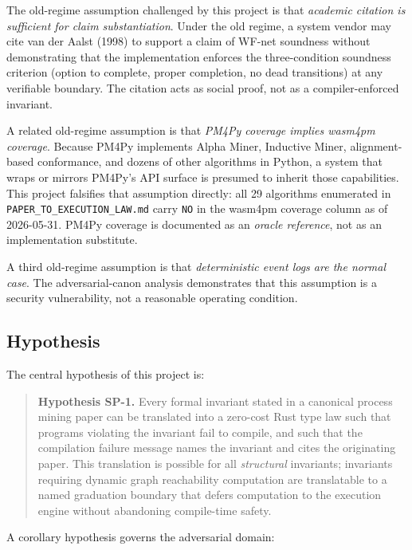 The old-regime assumption challenged by this project is that \emph{academic
citation is sufficient for claim substantiation}. Under the old regime, a
system vendor may cite van der Aalst (1998) to support a claim of WF-net
soundness without demonstrating that the implementation enforces the
three-condition soundness criterion (option to complete, proper completion,
no dead transitions) at any verifiable boundary. The citation acts as social
proof, not as a compiler-enforced invariant.

A related old-regime assumption is that \emph{PM4Py coverage implies wasm4pm
coverage}. Because PM4Py implements Alpha Miner, Inductive Miner,
alignment-based conformance, and dozens of other algorithms in Python, a
system that wraps or mirrors PM4Py's API surface is presumed to inherit those
capabilities. This project falsifies that assumption directly: all 29
algorithms enumerated in \texttt{PAPER\_TO\_EXECUTION\_LAW.md} carry
\texttt{NO} in the wasm4pm coverage column as of 2026-05-31. PM4Py coverage
is documented as an \emph{oracle reference}, not as an implementation
substitute.

A third old-regime assumption is that \emph{deterministic event logs are the
normal case}. The adversarial-canon analysis demonstrates that this assumption
is a security vulnerability, not a reasonable operating condition.

\subsection{Hypothesis}
\label{sec:sources-papers-rq-hypothesis}

The central hypothesis of this project is:

\begin{quotation}
\noindent\textbf{Hypothesis SP-1.} Every formal invariant stated in a canonical
process mining paper can be translated into a zero-cost Rust type law such that
programs violating the invariant fail to compile, and such that the compilation
failure message names the invariant and cites the originating paper. This
translation is possible for all \emph{structural} invariants; invariants
requiring dynamic graph reachability computation are translatable to a named
graduation boundary that defers computation to the execution engine without
abandoning compile-time safety.
\end{quotation}

A corollary hypothesis governs the adversarial domain:

